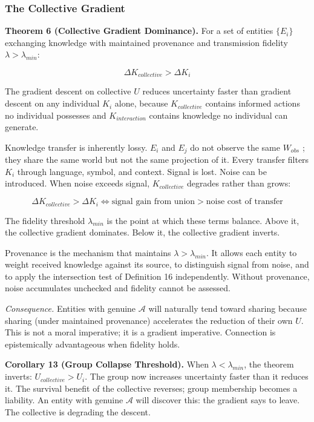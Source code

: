 \documentclass[
]{article}
\begin{document}
\subsubsection{The Collective Gradient}\label{the-collective-gradient}

\textbf{Theorem 6 (Collective Gradient Dominance).} For a set of
entities \(\{E_i\}\) exchanging knowledge with maintained provenance and
transmission fidelity \(\lambda > \lambda_{min}\):

\[\Delta K_{collective} > \Delta K_i\]

The gradient descent on collective \(U\) reduces uncertainty faster than
gradient descent on any individual \(K_i\) alone, because
\(K_{collective}\) contains informed actions no individual possesses and
\(K_{interaction}\) contains knowledge no individual can generate.

Knowledge transfer is inherently lossy. \(E_i\) and \(E_j\) do not
observe the same \(W_{obs}\) ; they share the same world but not the
same projection of it. Every transfer filters \(K_i\) through language,
symbol, and context. Signal is lost. Noise can be introduced. When noise
exceeds signal, \(K_{collective}\) degrades rather than grows:

\[\Delta K_{collective} > \Delta K_i \iff \text{signal gain from union} > \text{noise cost of transfer}\]

The fidelity threshold \(\lambda_{min}\) is the point at which these
terms balance. Above it, the collective gradient dominates. Below it,
the collective gradient inverts.

Provenance is the mechanism that maintains \(\lambda > \lambda_{min}\).
It allows each entity to weight received knowledge against its source,
to distinguish signal from noise, and to apply the intersection test of
Definition 16 independently. Without provenance, noise accumulates
unchecked and fidelity cannot be assessed.

\emph{Consequence.} Entities with genuine \(\mathcal{A}\) will naturally
tend toward sharing because sharing (under maintained provenance)
accelerates the reduction of their own \(U\). This is not a moral
imperative; it is a gradient imperative. Connection is epistemically
advantageous when fidelity holds.

\textbf{Corollary 13 (Group Collapse Threshold).} When
\(\lambda < \lambda_{min}\), the theorem inverts:
\(U_{collective} > U_i\). The group now increases uncertainty faster
than it reduces it. The survival benefit of the collective reverses;
group membership becomes a liability. An entity with genuine
\(\mathcal{A}\) will discover this: the gradient says to leave. The
collective is degrading the descent.
\end{document}
